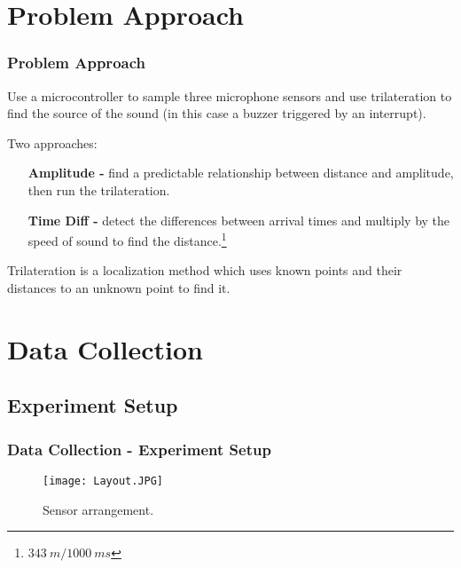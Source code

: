\section{Problem Approach}
\begin{frame}

	\frametitle{Problem Approach}
	
	Use a microcontroller to sample three microphone sensors and use trilateration to find the source of the sound (in this case a buzzer triggered by an interrupt).
	
	\vspace{0.5cm}
	
	Two approaches:
	\begin{itemize}
		\setlength{\itemindent}{4.5em}
		\item[\textbf{Amplitude - }] find a predictable relationship between distance and amplitude, then run the trilateration.
		\item[\textbf{Time Diff - }] detect the differences between arrival times and multiply by the speed of sound to find the distance.\footnote{$343 \: m / 1000 \: ms$}
	\end{itemize}
	
	\begin{definition}
		Trilateration is a localization method which uses known points and their distances to an unknown point to find it. 
	\end{definition}

\end{frame}


%
%

\section{Data Collection}
\subsection{Experiment Setup}
\begin{frame}

	\frametitle{Data Collection - Experiment Setup}
	
	\begin{figure}[h!]
		\centering
		\texttt{[image: Layout.JPG]}
		\caption{Sensor arrangement.}
	\end{figure}

\end{frame}


